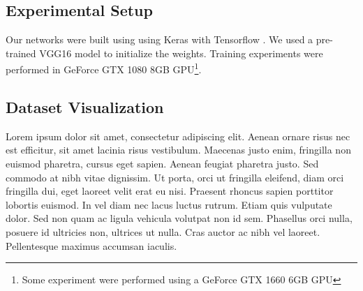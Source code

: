 \subsection{Experimental Setup}
\label{cap5_experimental_setup}

Our networks were built using using Keras \cite{chollet2015keras} with Tensorflow \cite{tensorflow2015-whitepaper}. 
We used a pre-trained VGG16 model to initialize the weights. 
Training experiments were performed in GeForce GTX 1080 8GB GPU\footnote{Some experiment were performed using a GeForce GTX 1660 6GB GPU}.

\subsection{Dataset Visualization}
\label{cap5_dataset_visualization}

{\color{red}

\cite{Vellido:2011}
\cite{Chatzimparmpas:2020}
\cite{Hohman:2019}
\cite{Chang:2016}

Lorem ipsum dolor sit amet, consectetur adipiscing elit. Aenean ornare risus nec est efficitur, sit amet lacinia risus vestibulum. Maecenas justo enim, fringilla non euismod pharetra, cursus eget sapien. Aenean feugiat pharetra justo. Sed commodo at nibh vitae dignissim. Ut porta, orci ut fringilla eleifend, diam orci fringilla dui, eget laoreet velit erat eu nisi. Praesent rhoncus sapien porttitor lobortis euismod. In vel diam nec lacus luctus rutrum. Etiam quis vulputate dolor. Sed non quam ac ligula vehicula volutpat non id sem. Phasellus orci nulla, posuere id ultricies non, ultrices ut nulla. Cras auctor ac nibh vel laoreet. Pellentesque maximus accumsan iaculis.

}

% 
% 
% 

